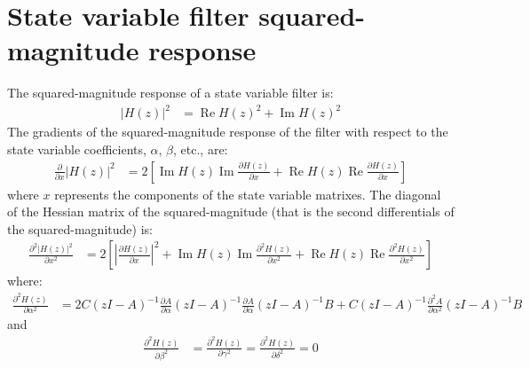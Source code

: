 \documentclass[a4paper,twoside,10pt,english]{report}
\begin{document}
\section{\label{app:State-variable-filter-squared-magnitude-response}State  variable  filter squared-magnitude response}
The squared-magnitude response of a state variable filter is:
\begin{align*}
\left|H\left(z\right)\right|^{2} &=
\operatorname{Re}H\left(z\right)^{2} +
\operatorname{Im}H\left(z\right)^{2}
\end{align*}
The gradients of the squared-magnitude response of the filter with respect to 
the state variable coefficients, $\alpha$, $\beta$, etc., are:
\begin{align*}
\frac{\partial}{\partial{}x}\left|H\left(z\right)\right|^{2} &= 
2\left[\operatorname{Im}H\left(z\right)
\operatorname{Im}\frac{\partial{}H\left(z\right)}{\partial{}x}+
\operatorname{Re}H\left(z\right)
\operatorname{Re}\frac{\partial{}H\left(z\right)}{\partial{}x}\right]
\end{align*}
where $x$ represents the components of the state variable matrixes. The 
diagonal of the Hessian matrix of the squared-magnitude (that is the second
differentials of the squared-magnitude) is:
\begin{align*}
\frac{\partial^{2}\left|H\left(z\right)\right|^{2}}{\partial{}x^{2}} &= 2\left[
\left|\frac{\partial{}H\left(z\right)}{\partial{}x}\right|^{2}+
\operatorname{Im}H\left(z\right)
\operatorname{Im}\frac{\partial^{2}H\left(z\right)}{\partial{}x^{2}}+
\operatorname{Re}H\left(z\right)
\operatorname{Re}\frac{\partial^{2}H\left(z\right)}{\partial{}x^{2}}\right]
\end{align*}
where:
\begin{align*}
\frac{\partial^{2}H\left(z\right)}{\partial\alpha^{2}} &= 
2C\left(zI-A\right)^{-1}\frac{\partial{}A}{\partial\alpha}
\left(zI-A\right)^{-1}\frac{\partial{}A}{\partial\alpha}\left(zI-A\right)^{-1}B+
C\left(zI-A\right)^{-1}\frac{\partial^{2}A}{\partial\alpha^{2}}
\left(zI-A\right)^{-1}B
\end{align*}
and
\begin{align*}
\frac{\partial^{2}H\left(z\right)}{\partial\beta^{2}} &= 
\frac{\partial^{2}H\left(z\right)}{\partial\gamma^{2}} = 
\frac{\partial^{2}H\left(z\right)}{\partial\delta^{2}} = 0
\end{align*}
\end{document}
